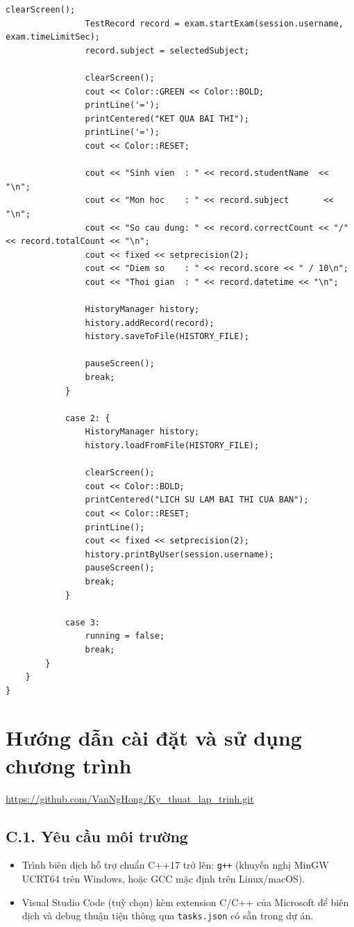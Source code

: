 \documentclass[11pt]{report}
\begin{document}
\begin{lstlisting}[caption={Menu.cpp -- Cài đặt giao diện Menu và điều hướng}, label={lst:full_menu_cpp}]
                clearScreen();
                TestRecord record = exam.startExam(session.username, exam.timeLimitSec);
                record.subject = selectedSubject;

                clearScreen();
                cout << Color::GREEN << Color::BOLD;
                printLine('=');
                printCentered("KET QUA BAI THI");
                printLine('=');
                cout << Color::RESET;

                cout << "Sinh vien  : " << record.studentName  << "\n";
                cout << "Mon hoc    : " << record.subject       << "\n";
                cout << "So cau dung: " << record.correctCount << "/" << record.totalCount << "\n";
                cout << fixed << setprecision(2);
                cout << "Diem so    : " << record.score << " / 10\n";
                cout << "Thoi gian  : " << record.datetime << "\n";

                HistoryManager history;
                history.addRecord(record);
                history.saveToFile(HISTORY_FILE);

                pauseScreen();
                break;
            }

            case 2: {
                HistoryManager history;
                history.loadFromFile(HISTORY_FILE);

                clearScreen();
                cout << Color::BOLD;
                printCentered("LICH SU LAM BAI THI CUA BAN");
                cout << Color::RESET;
                printLine();
                cout << fixed << setprecision(2);
                history.printByUser(session.username);
                pauseScreen();
                break;
            }

            case 3:
                running = false;
                break;
        }
    }
}
\end{lstlisting}

\chapter{Hướng dẫn cài đặt và sử dụng chương trình}

\url{https://github.com/VanNgHong/Ky_thuat_lap_trinh.git}

\section*{C.1. Yêu cầu môi trường}

\begin{itemize}[leftmargin=*]
    \item Trình biên dịch hỗ trợ chuẩn C++17 trở lên: \texttt{g++} (khuyến nghị MinGW UCRT64 trên Windows, hoặc GCC mặc định trên Linux/macOS).
    \item Visual Studio Code (tuỳ chọn) kèm extension C/C++ của Microsoft để biên dịch và debug thuận tiện thông qua \texttt{tasks.json} có sẵn trong dự án.
\end{itemize}
\end{document}
